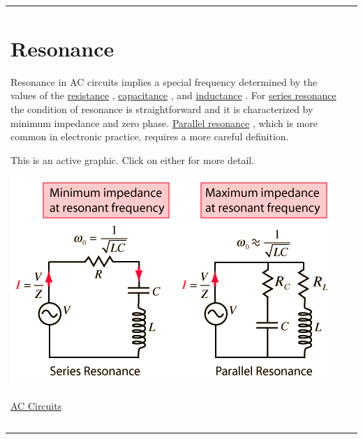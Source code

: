 \protect\hypertarget{c1}{}{}

\begin{longtable}[]{@{}ll@{}}
\toprule
\begin{minipage}[t]{0.48\columnwidth}\raggedright\strut
\section{Resonance}\label{resonance}

Resonance in AC circuits implies a special frequency determined by the
values of the
\href{http://hyperphysics.phy-astr.gsu.edu/hbase/electric/acres.html\#c1}{resistance}
,
\href{http://hyperphysics.phy-astr.gsu.edu/hbase/electric/accap.html\#c1}{capacitance}
, and
\href{http://hyperphysics.phy-astr.gsu.edu/hbase/electric/acind.html\#c1}{inductance}
. For
\href{http://hyperphysics.phy-astr.gsu.edu/hbase/electric/serres.html\#c2}{series
resonance} the condition of resonance is straightforward and it is
characterized by minimum impedance and zero phase.
\href{http://hyperphysics.phy-astr.gsu.edu/hbase/electric/parres.html\#c1}{Parallel
resonance} , which is more common in electronic practice, requires a
more careful definition.

This is an active graphic. Click on either for more detail.

\includegraphics{./Resonant RLC Circuits_files/acres.png}\strut
\end{minipage} & \begin{minipage}[t]{0.48\columnwidth}\raggedright\strut
\href{http://hyperphysics.phy-astr.gsu.edu/hbase/hframe.html}{Index}\\[2\baselineskip]\href{http://hyperphysics.phy-astr.gsu.edu/hbase/electric/accircon.html\#c1}{AC
Circuits}\strut
\end{minipage}\tabularnewline
\begin{minipage}[t]{0.48\columnwidth}\raggedright\strut
~


\end{minipage}
\end{longtable}
